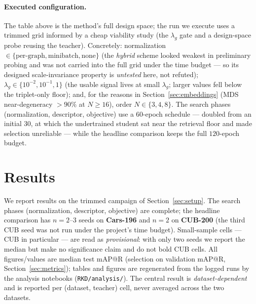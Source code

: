\documentclass[11pt,letterpaper]{article}
\begin{document}
\paragraph{Executed configuration.} The table above is the method's full design
space; the run we execute uses a trimmed grid informed by a cheap viability study
(the $\lambda_g$ gate and a design-space probe reusing the teacher). Concretely:
normalization $\in \{\text{per-graph}, \text{minibatch}, \text{none}\}$ (the
\emph{hybrid} scheme looked weakest in preliminary probing and was not carried into the
full grid under the time budget --- so its designed scale-invariance property is
\emph{untested} here, not refuted); $\lambda_g \in
\{10^{-2}, 10^{-1}, 1\}$ (the usable signal lives at small $\lambda_g$; larger values
fell below the triplet-only floor); and, for the reasons in
Section~\ref{sec:embeddings} (MDS near-degeneracy $>90\%$ at $N \geq 16$),
order $N \in \{3, 4, 8\}$. The search phases (normalization, descriptor, objective)
use a $60$-epoch schedule --- doubled from an initial $30$, at which the undertrained
student sat near the retrieval floor and made selection unreliable --- while the
headline comparison keeps the full $120$-epoch budget.

\section{Results}
\label{sec:results}


We report results on the trimmed campaign of Section~\ref{sec:setup}. The search
phases (normalization, descriptor, objective) are complete; the headline comparison
has $n{=}2$--$3$ seeds on \textbf{Cars-196} and $n{=}2$ on \textbf{CUB-200} (the third
CUB seed was not run under the project's time budget). Small-sample cells --- CUB in
particular --- are read as \emph{provisional}: with only two seeds we report the median
but make no significance claim and do not bold CUB cells. All figures/values are
median test mAP@R (selection on validation mAP@R, Section~\ref{sec:metrics}); tables
and figures are regenerated from the logged runs by the analysis notebooks
(\texttt{RKD/analysis/}). The central result is \emph{dataset-dependent} and is
reported per (dataset, teacher) cell, never averaged across the two datasets.
\end{document}
